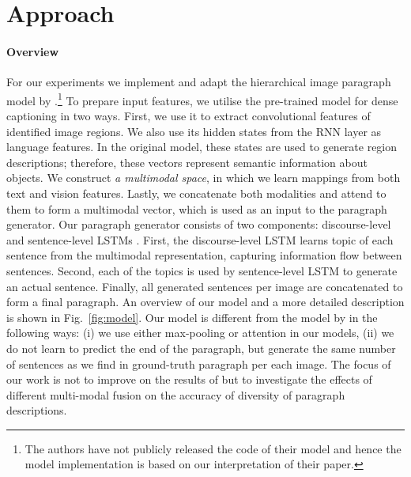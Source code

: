 \documentclass[11pt,a4paper]{article}
\begin{document}
\section{Approach}
\paragraph{Overview}
For our experiments we implement and adapt the hierarchical image paragraph model by \citet{krause2016hierarchical}.\footnote{The authors have not publicly released the code of their model and hence the model implementation is based on our interpretation of their paper.}
To prepare input features, we utilise the pre-trained model for dense captioning \cite{densecap} in two ways.
First, we use it to extract convolutional features of identified image regions.
We also use its hidden states from the RNN layer as language features.
In the original model, these states are used to generate region descriptions; therefore, these vectors represent semantic information about objects.
We construct \textit{a multimodal space}, in which we learn mappings from both text and vision features.
Lastly, we concatenate both modalities and attend to them to form a multimodal vector, which is used as an input to the paragraph generator.
Our paragraph generator consists of two components: discourse-level and sentence-level LSTMs \cite{lstm97}.
First, the discourse-level LSTM learns topic of each sentence from the multimodal representation, capturing information flow between sentences.
Second, each of the topics is used by sentence-level LSTM to generate an actual sentence.
Finally, all generated sentences per image are concatenated to form a final paragraph.
An overview of our model and a more detailed description is shown in Fig.~\ref{fig:model}.
Our model is different from the model by  in the following ways: (i) we use either max-pooling or attention in our models, (ii) we do not learn to predict the end of the paragraph, but generate the same number of sentences as we find in ground-truth paragraph per each image.
The focus of our work is not to improve on the results of  but to investigate the effects of different multi-modal fusion on the accuracy of diversity of paragraph descriptions. %
\end{document}
